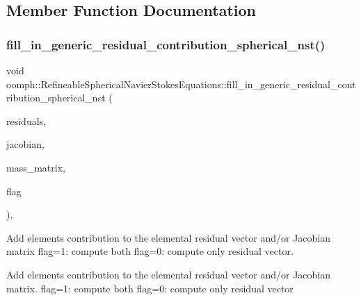 \subsection{Member Function Documentation}
\mbox{\label{classoomph_1_1RefineableSphericalNavierStokesEquations_aaadda4a5dbffc1e23db2ac8b3dd86d4a}} 
\subsubsection{\texorpdfstring{fill\+\_\+in\+\_\+generic\+\_\+residual\+\_\+contribution\+\_\+spherical\+\_\+nst()}{fill\_in\_generic\_residual\_contribution\_spherical\_nst()}}
{\footnotesize\ttfamily void oomph\+::\+Refineable\+Spherical\+Navier\+Stokes\+Equations\+::fill\+\_\+in\+\_\+generic\+\_\+residual\+\_\+contribution\+\_\+spherical\+\_\+nst (\begin{DoxyParamCaption}\item[{\hyperlink{classoomph_1_1Vector}{Vector}$<$ double $>$ \&}]{residuals,  }\item[{\hyperlink{classoomph_1_1DenseMatrix}{Dense\+Matrix}$<$ double $>$ \&}]{jacobian,  }\item[{\hyperlink{classoomph_1_1DenseMatrix}{Dense\+Matrix}$<$ double $>$ \&}]{mass\+\_\+matrix,  }\item[{unsigned}]{flag }\end{DoxyParamCaption})\hspace{0.3cm}{\ttfamily [private]}, {\ttfamily [virtual]}}



Add element\textquotesingle{}s contribution to the elemental residual vector and/or Jacobian matrix flag=1\+: compute both flag=0\+: compute only residual vector. 

Add element\textquotesingle{}s contribution to the elemental residual vector and/or Jacobian matrix. flag=1\+: compute both flag=0\+: compute only residual vector 

